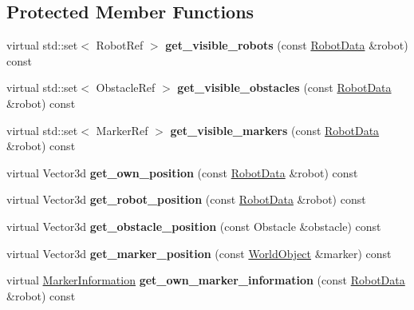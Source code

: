 \subsection*{Protected Member Functions}
\begin{CompactItemize}
\item 
\hypertarget{class_view_77f59999d4ea1a733c22c7f28bbc2c0a}{
virtual std::set$<$ RobotRef $>$ \textbf{get\_\-visible\_\-robots} (const \hyperlink{class_robot_data}{RobotData} \&robot) const }
\label{class_view_77f59999d4ea1a733c22c7f28bbc2c0a}

\item 
\hypertarget{class_view_4ee7073dc1981620d21deadaf9f2cc72}{
virtual std::set$<$ ObstacleRef $>$ \textbf{get\_\-visible\_\-obstacles} (const \hyperlink{class_robot_data}{RobotData} \&robot) const }
\label{class_view_4ee7073dc1981620d21deadaf9f2cc72}

\item 
\hypertarget{class_view_6cb28b7cf14724b9583e91f20beab5a7}{
virtual std::set$<$ MarkerRef $>$ \textbf{get\_\-visible\_\-markers} (const \hyperlink{class_robot_data}{RobotData} \&robot) const }
\label{class_view_6cb28b7cf14724b9583e91f20beab5a7}

\item 
\hypertarget{class_view_5d1818431b137cd5d60677060877f9e2}{
virtual Vector3d \textbf{get\_\-own\_\-position} (const \hyperlink{class_robot_data}{RobotData} \&robot) const }
\label{class_view_5d1818431b137cd5d60677060877f9e2}

\item 
\hypertarget{class_view_f2c2e048c57df924cfa28ae4ed0d55f0}{
virtual Vector3d \textbf{get\_\-robot\_\-position} (const \hyperlink{class_robot_data}{RobotData} \&robot) const }
\label{class_view_f2c2e048c57df924cfa28ae4ed0d55f0}

\item 
\hypertarget{class_view_5063b521b3dcf55aa59bbd7061ba63dd}{
virtual Vector3d \textbf{get\_\-obstacle\_\-position} (const Obstacle \&obstacle) const }
\label{class_view_5063b521b3dcf55aa59bbd7061ba63dd}

\item 
\hypertarget{class_view_a1ef1a0dd7bec784ab2648305c832273}{
virtual Vector3d \textbf{get\_\-marker\_\-position} (const \hyperlink{class_world_object}{WorldObject} \&marker) const }
\label{class_view_a1ef1a0dd7bec784ab2648305c832273}

\item 
\hypertarget{class_view_e0b85219f7f81f16c8cff5c62ba5a718}{
virtual \hyperlink{class_marker_information}{MarkerInformation} \textbf{get\_\-own\_\-marker\_\-information} (const \hyperlink{class_robot_data}{RobotData} \&robot) const }
\label{class_view_e0b85219f7f81f16c8cff5c62ba5a718}


\end{CompactItemize}
